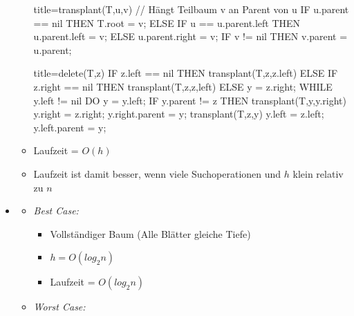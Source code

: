 \documentclass[
    12pt,
    a4paper,
    ngerman,
    color=3b,%
    marginpar=false,
    colorback=false,
    leqno,
]{tudaexercise}
\begin{document}
\begin{itemize}
\begin{itemize}
\begin{codeBlock}[autogobble]{title={transplant(T,u,v) // Hängt Teilbaum v an Parent von u}}
                            IF u.parent == nil THEN
                                T.root = v;
                            ELSE
                                IF u == u.parent.left THEN
                                    u.parent.left = v;
                                ELSE
                                    u.parent.right = v;
                            IF v != nil THEN
                                v.parent = u.parent;
                        \end{codeBlock}
                        \begin{codeBlock}[autogobble]{title={delete(T,z)}}
                            IF z.left == nil THEN
                                transplant(T,z,z.left)
                            ELSE
                                IF z.right == nil THEN
                                    transplant(T,z,z,left)
                                ELSE
                                    y = z.right;
                                    WHILE y.left != nil DO y = y.left;
                                    IF y.parent != z THEN
                                        transplant(T,y,y.right)
                                        y.right = z.right;
                                        y.right.parent = y;
                                    transplant(T,z,y)
                                    y.left = z.left;
                                    y.left.parent = y;
                        \end{codeBlock}
              \item Laufzeit = $O(h)$
              \item Laufzeit ist damit besser, wenn viele Suchoperationen und $h$ klein relativ zu $n$
          \end{itemize}
\clearpage
    \item {}
          \begin{itemize}
              \item \textit{Best Case:}
                    \begin{itemize}
                        \item Vollständiger Baum (Alle Blätter gleiche Tiefe)
                        \item $h = O(log_2 n)$
                        \item Laufzeit = $O(log_2 n)$
                    \end{itemize}
              \item \textit{Worst Case:}
                    \begin{itemize}

\end{itemize}
\end{itemize}
\end{itemize}
\end{document}
